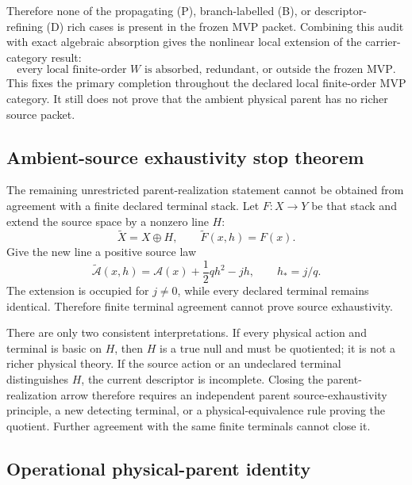\documentclass[11pt]{article}
\begin{document}
Therefore none of the propagating (P), branch-labelled (B), or descriptor-
refining (D) rich cases is present in the frozen MVP packet. Combining this
audit with exact algebraic absorption gives the nonlinear local extension of
the carrier-category result:
\begin{equation}
 \boxed{\text{every local finite-order }W\text{ is absorbed, redundant, or
 outside the frozen MVP.}}
 \label{eq:pbd-mvp-verdict}
\end{equation}
This fixes the primary completion throughout the declared local finite-order
MVP category. It still does not prove that the ambient physical parent has no
richer source packet.

\subsection{Ambient-source exhaustivity stop theorem}

The remaining unrestricted parent-realization statement cannot be obtained
from agreement with a finite declared terminal stack. Let
\(F:X\rightarrow Y\) be that stack and
extend the source space by a nonzero line \(H\):
\begin{equation}
 \widetilde X=X\oplus H,
 \qquad
 \widetilde F(x,h)=F(x).
 \label{eq:hidden-source-extension}
\end{equation}
Give the new line a positive source law
\begin{equation}
 \widetilde{\mathcal A}(x,h)=\mathcal A(x)+\frac12qh^2-jh,
 \qquad h_*=j/q.
 \label{eq:hidden-source-action}
\end{equation}
The extension is occupied for \(j\ne0\), while every declared terminal remains
identical. Therefore finite terminal agreement cannot prove source
exhaustivity.

There are only two consistent interpretations. If every physical action and
terminal is basic on \(H\), then \(H\) is a true null and must be quotiented; it
is not a richer physical theory. If the source action or an undeclared terminal
distinguishes \(H\), the current descriptor is incomplete. Closing the
parent-realization arrow therefore requires an independent parent source-exhaustivity
principle, a new detecting terminal, or a physical-equivalence rule proving
the quotient. Further agreement with the same finite terminals cannot close it.

\subsection{Operational physical-parent identity}
\end{document}

